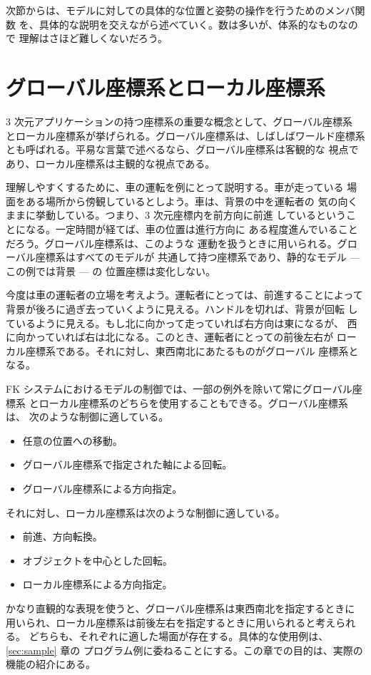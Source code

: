 次節からは、モデルに対しての具体的な位置と姿勢の操作を行うためのメンバ関数
を、具体的な説明を交えながら述べていく。数は多いが、体系的なものなので
理解はさほど難しくないだろう。
\section{グローバル座標系とローカル座標系}
3 次元アプリケーションの持つ座標系の重要な概念として、グローバル座標系
とローカル座標系が挙げられる。グローバル座標系は、しばしばワールド座標系
とも呼ばれる。平易な言葉で述べるなら、グローバル座標系は客観的な
視点であり、ローカル座標系は主観的な視点である。

理解しやすくするために、車の運転を例にとって説明する。車が走っている
場面をある場所から傍観しているとしよう。車は、背景の中を運転者の
気の向くままに挙動している。つまり、3 次元座標内を前方向に前進
しているということになる。一定時間が経てば、車の位置は進行方向に
ある程度進んでいることだろう。グローバル座標系は、このような
運動を扱うときに用いられる。グローバル座標系はすべてのモデルが
共通して持つ座標系であり、静的なモデル --- この例では背景 --- の
位置座標は変化しない。

今度は車の運転者の立場を考えよう。運転者にとっては、前進することによって
背景が後ろに過ぎ去っていくように見える。ハンドルを切れば、背景が回転
しているように見える。もし北に向かって走っていれば右方向は東になるが、
西に向かっていれば右は北になる。このとき、運転者にとっての前後左右が
ローカル座標系である。それに対し、東西南北にあたるものがグローバル
座標系となる。

FK システムにおけるモデルの制御では、一部の例外を除いて常にグローバル座標系
とローカル座標系のどちらを使用することもできる。グローバル座標系は、
次のような制御に適している。
\begin{itemize}
 \item 任意の位置への移動。
 \item グローバル座標系で指定された軸による回転。
 \item グローバル座標系による方向指定。
\end{itemize}
それに対し、ローカル座標系は次のような制御に適している。
\begin{itemize}
 \item 前進、方向転換。
 \item オブジェクトを中心とした回転。
 \item ローカル座標系による方向指定。
\end{itemize}
かなり直観的な表現を使うと、グローバル座標系は東西南北を指定するときに
用いられ、ローカル座標系は前後左右を指定するときに用いられると考えられる。
どちらも、それぞれに適した場面が存在する。具体的な使用例は、
\ref{sec:sample} 章の
プログラム例に委ねることにする。この章での目的は、実際の機能の紹介にある。

